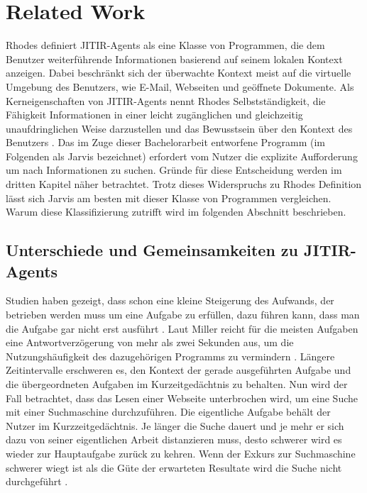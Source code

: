 \section{Related Work}
Rhodes \cite{rhodes2000just} definiert JITIR-Agents als eine Klasse von Programmen, die dem Benutzer weiterführende Informationen basierend auf seinem lokalen Kontext anzeigen. Dabei beschränkt sich der überwachte Kontext meist auf die virtuelle Umgebung des Benutzers, wie E-Mail, Webseiten und geöffnete Dokumente. Als Kerneigenschaften von JITIR-Agents nennt Rhodes Selbstständigkeit, die Fähigkeit Informationen in einer leicht zugänglichen und gleichzeitig unaufdringlichen Weise darzustellen und das Bewusstsein über den Kontext des Benutzers \cite{rhodes2000thesis}.
Das im Zuge dieser Bachelorarbeit entworfene Programm (im Folgenden als Jarvis bezeichnet) erfordert vom Nutzer die explizite Aufforderung um nach Informationen zu suchen. Gründe für diese Entscheidung werden im dritten Kapitel näher betrachtet. Trotz dieses Widerspruchs zu Rhodes Definition lässt sich Jarvis am besten mit dieser Klasse von Programmen vergleichen. Warum diese Klassifizierung zutrifft wird im folgenden Abschnitt beschrieben.

\subsection{Unterschiede und Gemeinsamkeiten zu JITIR-Agents}
Studien haben gezeigt, dass schon eine kleine Steigerung des Aufwands, der betrieben werden muss um eine Aufgabe zu erfüllen, dazu führen kann, dass man die Aufgabe gar nicht erst ausführt \cite{rhodes2000just}. Laut Miller reicht für die meisten Aufgaben eine Antwortverzögerung von mehr als zwei Sekunden aus, um die Nutzungshäufigkeit des dazugehörigen Programms zu vermindern \cite{miller1968response}. Längere Zeitintervalle erschweren es, den Kontext der gerade ausgeführten Aufgabe und die übergeordneten Aufgaben im Kurzeitgedächtnis zu behalten. Nun wird der Fall betrachtet, dass das Lesen einer Webseite unterbrochen wird, um eine Suche mit einer Suchmaschine durchzuführen. Die eigentliche Aufgabe behält der Nutzer im Kurzzeitgedächtnis. Je länger die Suche dauert und je mehr er sich dazu von seiner eigentlichen Arbeit distanzieren muss, desto schwerer wird es wieder zur Hauptaufgabe zurück zu kehren. Wenn der Exkurs zur Suchmaschine schwerer wiegt ist als die Güte der erwarteten Resultate wird die Suche nicht durchgeführt \cite{rhodes2000just}.

